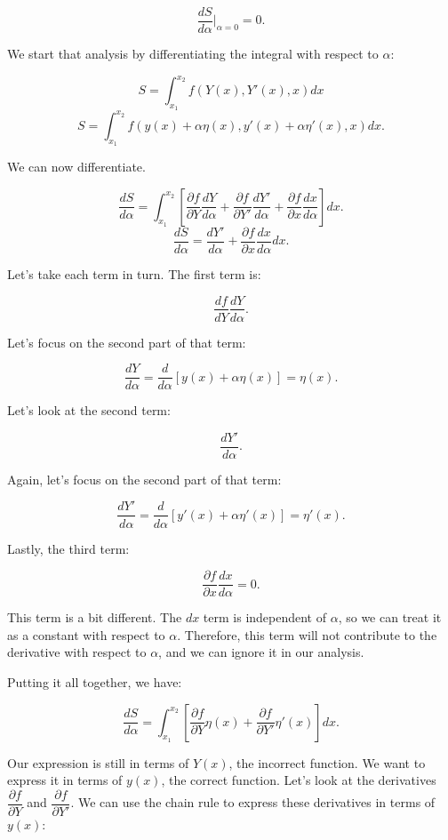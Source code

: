 \documentclass[11pt]{article}
\begin{document}
\[\dfrac{dS}{d\alpha}|_{\alpha=0} = 0.\]

We start that analysis by differentiating the integral with respect to
\(\alpha\):

\[S = \int_{x_1}^{x_2} f(Y(x),Y'(x),x) dx\]
\[S = \int_{x_1}^{x_2} f(y(x) + \alpha\eta(x), y'(x) + \alpha\eta'(x), x) dx.\]

We can now differentiate.

\[\dfrac{dS}{d\alpha} = \int_{x_1}^{x_2} \left[ \dfrac{\partial f}{\partial Y}\dfrac{dY}{d\alpha} + \dfrac{\partial f}{\partial Y'}\dfrac{dY'}{d\alpha} + \dfrac{\partial f}{\partial x}\dfrac{dx}{d\alpha} \right] dx.\]
\[\dfrac{dS}{d\alpha} = \dfrac{dY'}{d\alpha}+ \dfrac{\partial f}{\partial x}\dfrac{dx}{d\alpha} dx.\]

Let's take each term in turn. The first term is:

\[\dfrac{df}{dY}\dfrac{dY}{d\alpha}.\]

Let's focus on the second part of that term:

\[\dfrac{dY}{d\alpha} = \dfrac{d}{d\alpha}\left[y(x) + \alpha\eta(x)\right] = \eta(x).\]

Let's look at the second term:

\[\dfrac{dY'}{d\alpha}.\]

Again, let's focus on the second part of that term:

\[\dfrac{dY'}{d\alpha} = \dfrac{d}{d\alpha}\left[y'(x) + \alpha\eta'(x)\right] = \eta'(x).\]

Lastly, the third term:

\[\dfrac{\partial f}{\partial x}\dfrac{dx}{d\alpha}=0.\]

This term is a bit different. The \(dx\) term is independent of
\(\alpha\), so we can treat it as a constant with respect to \(\alpha\).
Therefore, this term will not contribute to the derivative with respect
to \(\alpha\), and we can ignore it in our analysis.

Putting it all together, we have:

\[\dfrac{dS}{d\alpha} = \int_{x_1}^{x_2}\left[ \dfrac{\partial f}{\partial Y}\eta(x) + \dfrac{\partial f}{\partial Y'}\eta'(x) \right] dx.\]

Our expression is still in terms of \(Y(x)\), the incorrect function. We
want to express it in terms of \(y(x)\), the correct function. Let's
look at the derivatives \(\dfrac{\partial f}{\partial Y}\) and
\(\dfrac{\partial f}{\partial Y'}\). We can use the chain rule to
express these derivatives in terms of \(y(x)\):
\end{document}
